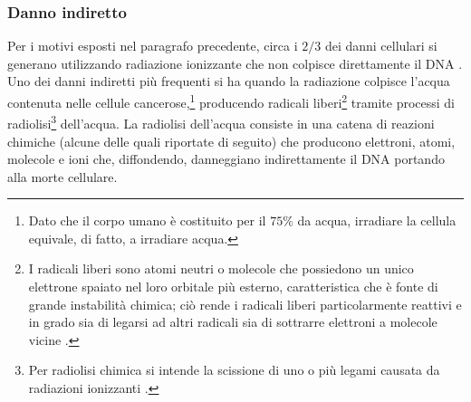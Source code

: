 \documentclass[12pt,a4paper,twoside]{report}
\begin{document}
	\subsubsection{Danno indiretto}\label{par:danno_indiretto}
	Per i motivi esposti nel paragrafo precedente, circa i $2/3$ dei danni cellulari si generano utilizzando radiazione ionizzante che non colpisce direttamente il DNA \cite{dkfz_conference}. Uno dei danni indiretti più frequenti si ha quando la radiazione colpisce l'acqua contenuta nelle cellule cancerose,\footnote{Dato che il corpo umano è costituito per il $75\%$ da acqua, irradiare la cellula equivale, di fatto, a irradiare acqua.} producendo radicali liberi\footnote{I radicali liberi sono atomi neutri o molecole che possiedono un unico elettrone spaiato nel loro orbitale più esterno, caratteristica che è fonte di grande instabilità chimica; ciò rende i radicali liberi particolarmente reattivi e in grado sia di legarsi ad altri radicali sia di sottrarre elettroni a molecole vicine \cite{Silvestroni1996-xz}.} tramite processi di radiolisi\footnote{Per radiolisi chimica si intende la scissione di uno o più legami causata da radiazioni ionizzanti \cite{IUPAC+R05112+2019}.} dell'acqua. La radiolisi dell'acqua consiste in una catena di reazioni chimiche (alcune delle quali riportate di seguito) che producono elettroni, atomi, molecole e ioni che, diffondendo, danneggiano indirettamente il DNA portando alla morte cellulare.
	
\end{document}

